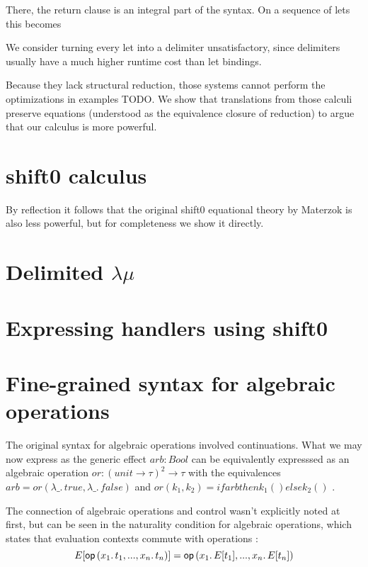 \documentclass[a4paper, 11pt,titlepage, openright, twoside]{report}
\newcommand{\keyword}[1]{\textsf{\textup{#1}}}
\newcommand{\KwOp}{\keyword{op}}
\newcommand{\Op}{\KwOp\,}
\newcommand{\KwHandle}{\keyword{handle}}
\newcommand{\Handle}{\KwHandle\;}
\newcommand{\KwWith}{\keyword{with}}
\newcommand{\With}{\;\KwWith\;}
\newcommand{\+}{\enspace}
\begin{document}
There, the return clause is an integral part of the syntax. On a sequence of lets this becomes

We consider turning every let into a delimiter unsatisfactory, since delimiters usually have a much higher runtime cost than let bindings.

Because they lack structural reduction, those systems cannot perform the optimizations in examples TODO.
We show that translations from those calculi preserve equations (understood as the equivalence closure of reduction)
to argue that our calculus is more powerful.

\section{shift0 calculus}
By reflection\cite{ppdp21} it follows that the original shift0 equational theory by Materzok is also less powerful,
but for completeness we show it directly.

\section{Delimited \texorpdfstring{$λμ$}{lambda-mu}}

\section{Expressing handlers using shift0}

\section{Fine-grained syntax for algebraic operations}
The original syntax for algebraic operations involved continuations.
What we may now express as the generic effect $arb : Bool$
can be equivalently expresssed as an algebraic operation $or : (unit → τ)^2 → τ$
with the equivalences $arb = or(λ\_.\,true, λ\_.\,false)$ and
$or(k_1,k_2) = if arb then k_1 () else k_2 ()$ \cite{alggen}.


The connection of algebraic operations and control wasn't explicitly noted at first,
but can be seen in the naturality condition for algebraic operations,
which states that evaluation contexts commute with operations \cite{logic, handling}:
$$E[\Op(x_1.\,t_1, ..., x_n.\,t_n)] = \Op(x_1.\,E[t_1], ..., x_n.\,E[t_n])$$
\end{document}
